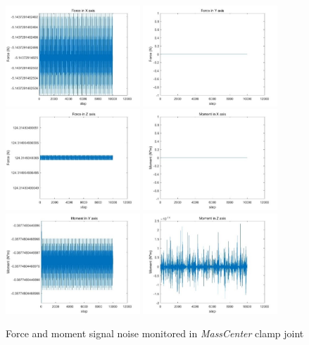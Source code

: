 \begin{figure}[htbp]
    \centering
    \includegraphics[width=0.45\textwidth]{Images/Vertify init/Picture1.jpg}
    \hfil
    \includegraphics[width=0.45\textwidth]{Images/Vertify init/Picture2.jpg}
    \includegraphics[width=0.45\textwidth]{Images/Vertify init/Picture3.jpg}
    \hfil
    \includegraphics[width=0.45\textwidth]{Images/Vertify init/Picture4.jpg}
    \includegraphics[width=0.45\textwidth]{Images/Vertify init/Picture5.jpg}
    \hfil
    \includegraphics[width=0.45\textwidth]{Images/Vertify init/Picture6.jpg}
    \caption{Force and moment signal noise monitored in \textit{MassCenter} clamp joint}
    \label{fig:Force and moment monitored in clamp joint}
\end{figure}

